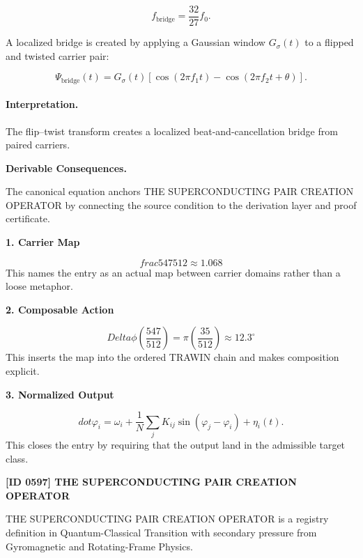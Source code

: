 \begin{equation}
f_{\mathrm{bridge}}=\frac{32}{27}f_0.
\end{equation}

A localized bridge is created by applying a Gaussian window $G_\sigma(t)$ to a flipped and twisted carrier pair:

\begin{equation}
\boxed{
\Psi_{\mathrm{bridge}}(t)
=
G_{\sigma}(t)
\left[
\cos(2\pi f_1t)
-
\cos(2\pi f_2t+\theta)
\right].
}
\end{equation}

\paragraph{Interpretation.}
The flip--twist transform creates a localized beat-and-cancellation bridge from paired carriers.

\par\vspace{0.35em}
\noindent\textbf{Derivable Consequences.}\quad
\begingroup
\footnotesize
\raggedright
The canonical equation anchors THE SUPERCONDUCTING PAIR CREATION OPERATOR by connecting the source condition to the derivation layer and proof certificate.
\par\endgroup

\noindent\textbf{1. Carrier Map}\par
\[
frac{547}{512} \approx 1.068
\]
\noindent This names the entry as an actual map between carrier domains rather than a loose metaphor.\par
\noindent\textbf{2. Composable Action}\par
\[
Delta\phi\left(\frac{547}{512}\right) = \pi\left(\frac{35}{512}\right) \approx 12.3^\circ
\]
\noindent This inserts the map into the ordered TRAWIN chain and makes composition explicit.\par
\noindent\textbf{3. Normalized Output}\par
\[
dot\varphi_i = \omega_i + \frac{1}{N}\sum_j K_{ij}\sin(\varphi_j-\varphi_i) + \eta_i(t).
\]
\noindent This closes the entry by requiring that the output land in the admissible target class.\par

\clearpage
\noindent\textbf{[ID 0597] THE SUPERCONDUCTING PAIR CREATION OPERATOR}\par
\vspace{0.35em}
\begingroup\small
{}
THE SUPERCONDUCTING PAIR CREATION OPERATOR is a registry definition in Quantum-Classical Transition with secondary pressure from Gyromagnetic and Rotating-Frame Physics.

